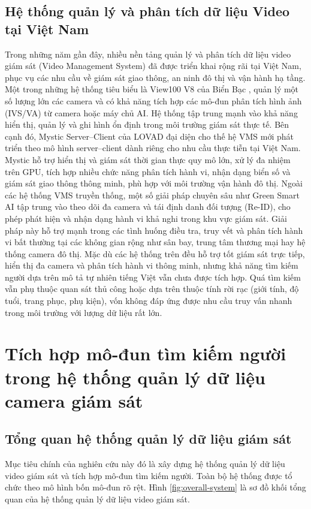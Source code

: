 \documentclass{jstarticle}
\begin{document}
\subsection{Hệ thống quản lý và phân tích dữ liệu Video tại Việt Nam}
Trong những năm gần đây, nhiều nền tảng quản lý và phân tích dữ liệu video giám sát (Video Management System)  đã được triển khai rộng rãi tại Việt Nam, phục vụ các nhu cầu về giám sát giao thông, an ninh đô thị và vận hành hạ tầng. Một trong những hệ thống tiêu biểu là View100 V8  của Biển Bạc \cite{bienbac2022}, quản lý một số lượng lớn các camera và có khả năng tích hợp các mô-đun phân tích hình ảnh (IVS/VA) từ camera hoặc máy chủ AI. Hệ thống tập trung mạnh vào khả năng hiển thị, quản lý và ghi hình ổn định trong môi trường giám sát thực tế. Bên cạnh đó, Mystic Server–Client của LOVAD \cite{lovad2025mystic} đại diện cho thế hệ VMS mới phát triển theo mô hình server–client dành riêng cho nhu cầu thực tiễn tại Việt Nam. Mystic hỗ trợ hiển thị và giám sát thời gian thực quy mô lớn, xử lý đa nhiệm trên GPU, tích hợp nhiều chức năng phân tích hành vi, nhận dạng biển số và giám sát giao thông thông minh, phù hợp với môi trường vận hành đô thị. Ngoài các hệ thống VMS truyền thống, một số giải pháp chuyên sâu như Green Smart AI \cite{greensmart2025} tập trung vào theo dõi đa camera và tái định danh đối tượng (Re-ID), cho phép phát hiện và nhận dạng hành vi khả nghi trong khu vực giám sát. Giải pháp này hỗ trợ mạnh trong các tình huống điều tra, truy vết và phân tích hành vi bất thường tại các không gian rộng như sân bay, trung tâm thương mại hay hệ thống camera đô thị. Mặc dù các hệ thống trên đều hỗ trợ tốt giám sát trực tiếp, hiển thị đa camera và phân tích hành vi thông minh, nhưng khả năng tìm kiếm người dựa trên mô tả tự nhiên tiếng Việt vẫn chưa được tích hợp. Quá tìm kiếm vẫn phụ thuộc quan sát thủ công hoặc dựa trên thuộc tính rời rạc (giới tính, độ tuổi, trang phục, phụ kiện), vốn không đáp ứng được nhu cầu truy vấn nhanh trong môi trường với lượng dữ liệu rất lớn.

\section{Tích hợp mô-đun tìm kiếm người trong hệ thống quản lý dữ liệu camera giám sát}
\subsection{Tổng quan hệ thống quản lý dữ liệu giám sát}
Mục tiêu chính của nghiên cứu này đó là xây dựng hệ thống quản lý dữ liệu video giám sát và tích hợp mô-đun tìm kiếm người. Toàn bộ hệ thống được tổ chức theo mô hình bốn mô-đun rõ rệt. Hình \ref{fig:overall-system} là sơ đồ khối tổng quan của hệ thống quản lý dữ liệu video giám sát.
\end{document}
